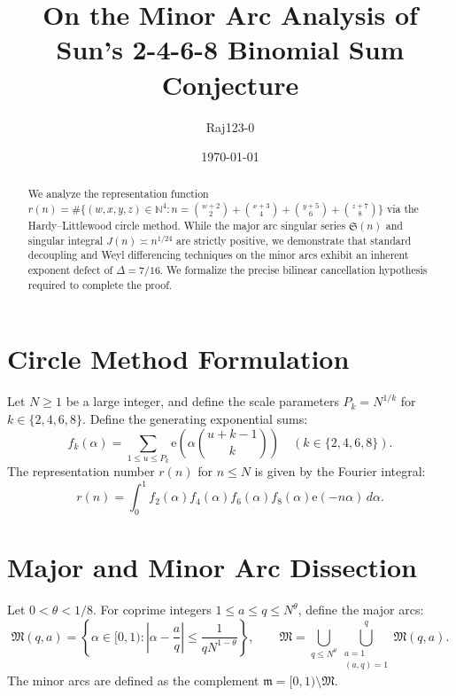 \documentclass[11pt,reqno]{amsart}
\title{On the Minor Arc Analysis of Sun's 2-4-6-8 Binomial Sum Conjecture}
\author{Raj123-0}
\date{\today}
\theoremstyle{remark}
\newcommand{\e}{\mathrm{e}}
\newcommand{\m}{\mathfrak{m}}
\newcommand{\M}{\mathfrak{M}}
\begin{document}
\maketitle

\begin{abstract}
We analyze the representation function $r(n) = \#\{(w,x,y,z) \in \mathbb{N}^4 : n = \binom{w+2}{2} + \binom{x+3}{4} + \binom{y+5}{6} + \binom{z+7}{8}\}$ via the Hardy--Littlewood circle method. While the major arc singular series $\mathfrak{S}(n)$ and singular integral $J(n) \asymp n^{1/24}$ are strictly positive, we demonstrate that standard decoupling and Weyl differencing techniques on the minor arcs exhibit an inherent exponent defect of $\Delta = 7/16$. We formalize the precise bilinear cancellation hypothesis required to complete the proof.
\end{abstract}

\section{Circle Method Formulation}

Let $N \ge 1$ be a large integer, and define the scale parameters $P_k = N^{1/k}$ for $k \in \{2, 4, 6, 8\}$. Define the generating exponential sums:
\begin{equation}
    f_k(\alpha) = \sum_{1 \le u \le P_k} \e\left(\alpha \binom{u+k-1}{k}\right) \quad (k \in \{2, 4, 6, 8\}).
\end{equation}
The representation number $r(n)$ for $n \le N$ is given by the Fourier integral:
\begin{equation}
    r(n) = \int_0^1 f_2(\alpha) f_4(\alpha) f_6(\alpha) f_8(\alpha) \e(-n\alpha) \, d\alpha.
\end{equation}

\section{Major and Minor Arc Dissection}

Let $0 < \theta < 1/8$. For coprime integers $1 \le a \le q \le N^\theta$, define the major arcs:
\begin{equation}
    \M(q, a) = \left\{ \alpha \in [0, 1) : \left| \alpha - \frac{a}{q} \right| \le \frac{1}{q N^{1 - \theta}} \right\}, \qquad \M = \bigcup_{q \le N^\theta} \bigcup_{\substack{a=1 \\ (a,q)=1}}^q \M(q, a).
\end{equation}
The minor arcs are defined as the complement $\m = [0, 1) \setminus \M$.
\end{document}
